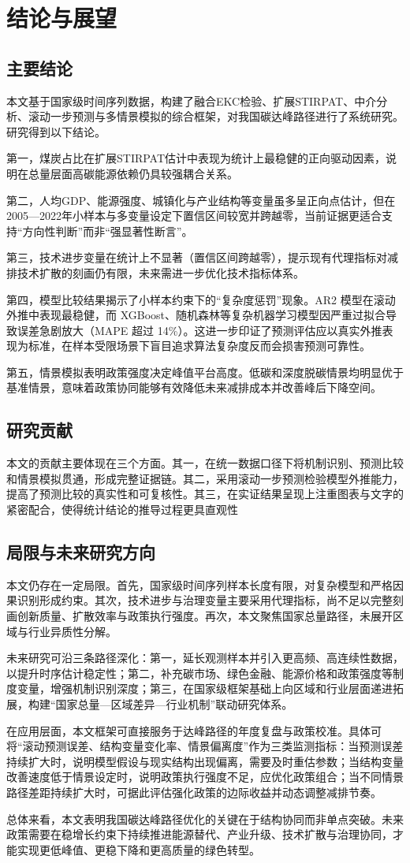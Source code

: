 \section{结论与展望}
\subsection{主要结论}
本文基于国家级时间序列数据，构建了融合EKC检验、扩展STIRPAT、中介分析、滚动一步预测与多情景模拟的综合框架，对我国碳达峰路径进行了系统研究。研究得到以下结论。

第一，煤炭占比在扩展STIRPAT估计中表现为统计上最稳健的正向驱动因素，说明在总量层面高碳能源依赖仍具较强耦合关系。

第二，人均GDP、能源强度、城镇化与产业结构等变量虽多呈正向点估计，但在2005—2022年小样本与多变量设定下置信区间较宽并跨越零，当前证据更适合支持“方向性判断”而非“强显著性断言”。

第三，技术进步变量在统计上不显著（置信区间跨越零），提示现有代理指标对减排技术扩散的刻画仍有限，未来需进一步优化技术指标体系。

第四，模型比较结果揭示了小样本约束下的“复杂度惩罚”现象。AR2 模型在滚动外推中表现最稳健，而 XGBoost、随机森林等复杂机器学习模型因严重过拟合导致误差急剧放大（MAPE 超过 14\%）。这进一步印证了预测评估应以真实外推表现为标准，在样本受限场景下盲目追求算法复杂度反而会损害预测可靠性。

第五，情景模拟表明政策强度决定峰值平台高度。低碳和深度脱碳情景均明显优于基准情景，意味着政策协同能够有效降低未来减排成本并改善峰后下降空间。

\subsection{研究贡献}
本文的贡献主要体现在三个方面。其一，在统一数据口径下将机制识别、预测比较和情景模拟贯通，形成完整证据链。其二，采用滚动一步预测检验模型外推能力，提高了预测比较的真实性和可复核性。其三，在实证结果呈现上注重图表与文字的紧密配合，使得统计结论的推导过程更具直观性

\subsection{局限与未来研究方向}
本文仍存在一定局限。首先，国家级时间序列样本长度有限，对复杂模型和严格因果识别形成约束。其次，技术进步与治理变量主要采用代理指标，尚不足以完整刻画创新质量、扩散效率与政策执行强度。再次，本文聚焦国家总量路径，未展开区域与行业异质性分解。

未来研究可沿三条路径深化：第一，延长观测样本并引入更高频、高连续性数据，以提升时序估计稳定性；第二，补充碳市场、绿色金融、能源价格和政策强度等制度变量，增强机制识别深度；第三，在国家级框架基础上向区域和行业层面递进拓展，构建“国家总量—区域差异—行业机制”联动研究体系。

在应用层面，本文框架可直接服务于达峰路径的年度复盘与政策校准。具体可将“滚动预测误差、结构变量变化率、情景偏离度”作为三类监测指标：当预测误差持续扩大时，说明模型假设与现实结构出现偏离，需要及时重估参数；当结构变量改善速度低于情景设定时，说明政策执行强度不足，应优化政策组合；当不同情景路径差距持续扩大时，可据此评估强化政策的边际收益并动态调整减排节奏。

总体来看，本文表明我国碳达峰路径优化的关键在于结构协同而非单点突破。未来政策需要在稳增长约束下持续推进能源替代、产业升级、技术扩散与治理协同，才能实现更低峰值、更稳下降和更高质量的绿色转型。
